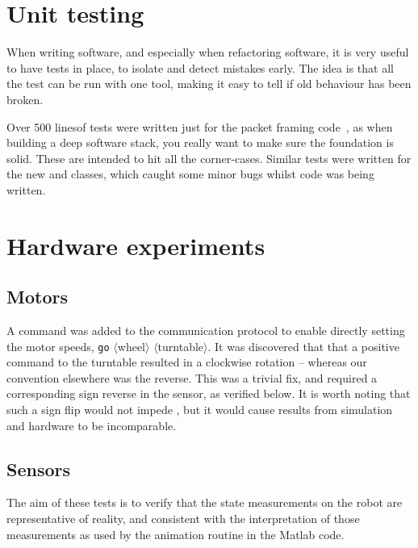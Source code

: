 \documentclass[main.tex]{subfiles}
\begin{document}
\section{Unit testing}
	When writing software, and especially when refactoring software, it is very useful to have tests in place, to isolate and detect mistakes early.
	The idea is that all the test can be run with one tool, making it easy to tell if old behaviour has been broken.

	Over 500 lines\footnotemark of tests were written just for the packet framing code~\cite{packetio}, as when building a deep software stack, you really want to make sure the foundation is solid. These are intended to hit all the corner-cases.
	Similar tests were written for the new  and  classes, which caught some minor bugs whilst code was being written.


\section{Hardware experiments}

	\subsection{Motors}
		A command was added to the communication protocol to enable directly setting the motor speeds, \texttt{go} $\langle$wheel$\rangle$ $\langle$turntable$\rangle$.
		It was discovered that that a positive command to the turntable resulted in a clockwise rotation -- whereas our convention elsewhere was the reverse.
		This was a trivial fix, and required a corresponding sign reverse in the sensor, as verified below.
		It is worth noting that such a sign flip would not impede {\Pilco}, but it would cause results from simulation and hardware to be incomparable.

	\subsection{Sensors}
		The aim of these tests is to verify that the state measurements on the robot are representative of reality, and consistent with the interpretation of those measurements as used by the animation routine in the Matlab code\footnotemark.
\end{document}

